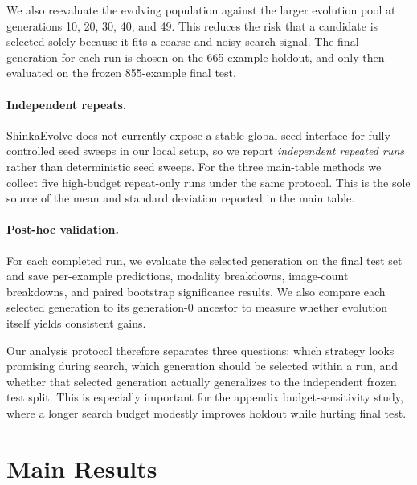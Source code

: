 \documentclass[11pt]{article}
\begin{document}
We also reevaluate the evolving population against the larger evolution pool at generations 10, 20, 30, 40, and 49. This reduces the risk that a candidate is selected solely because it fits a coarse and noisy search signal. The final generation for each run is chosen on the 665-example holdout, and only then evaluated on the frozen 855-example final test.

\paragraph{Independent repeats.}
ShinkaEvolve does not currently expose a stable global seed interface for fully controlled seed sweeps in our local setup, so we report \emph{independent repeated runs} rather than deterministic seed sweeps. For the three main-table methods we collect five high-budget repeat-only runs under the same protocol. This is the sole source of the mean and standard deviation reported in the main table.

\paragraph{Post-hoc validation.}
For each completed run, we evaluate the selected generation on the final test set and save per-example predictions, modality breakdowns, image-count breakdowns, and paired bootstrap significance results. We also compare each selected generation to its generation-0 ancestor to measure whether evolution itself yields consistent gains.

Our analysis protocol therefore separates three questions: which strategy looks promising during search, which generation should be selected within a run, and whether that selected generation actually generalizes to the independent frozen test split. This is especially important for the appendix budget-sensitivity study, where a longer search budget modestly improves holdout while hurting final test.

\section{Main Results}

\begin{table}[t]
\centering
\small
{}
\caption{Main repeat-only high-budget results. All numbers come from the publication-clean repeated runs under the same protocol.}
\label{tab:main-results}
\end{table}
\end{document}
